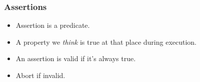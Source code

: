 \begin{frame}
    \frametitle{Assertions}
    \begin{itemize}
        \item Assertion is a predicate.
        \pause \item A property we \emph{think} is true at that place during
            execution.
        \pause \item An assertion is valid if it's always true.
        \pause \item Abort if invalid.
    \end{itemize}
\end{frame}
